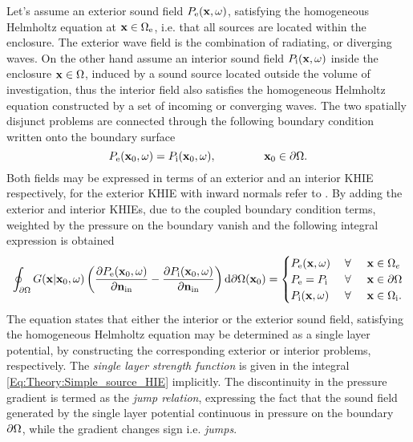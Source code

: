 Let's assume an exterior sound field $P_{\mathrm{e}}(\mathbf{x},\omega)$, satisfying the homogeneous Helmholtz equation at $\mathbf{x} \in \Omega_{\mathrm{e}}$, i.e. that all sources are located within the enclosure. The exterior wave field is the combination of radiating, or diverging waves. On the other hand assume an interior sound field $P_{\mathrm{i}}(\mathbf{x},\omega)$ inside the enclosure $\mathbf{x} \in \Omega$, induced by a sound source located outside the volume of investigation, thus the interior field also satisfies the homogeneous Helmholtz equation constructed by a set of incoming or converging waves.
The two spatially disjunct problems are connected through the following boundary condition written onto the boundary surface
\begin{equation}
P_{\mathrm{e}}(\vxo,\omega) = P_{\mathrm{i}}(\vxo,\omega), \hspace{15mm} \vxo \in \dO.
\end{equation}
Both fields may be expressed in terms of an exterior and an interior KHIE respectively, for the exterior KHIE with inward normals refer to \cite[eq. 8.30]{Williams1999}.
By adding the exterior and interior KHIEs, due to the coupled boundary condition terms, weighted by the pressure on the boundary vanish and the following integral expression is obtained \cite[p.~268.]{Williams1999}
\begin{equation}
\oint_{\partial \Omega} 
G(\mathbf{x}|\mathbf{x}_0,\omega) 
\left(
\frac{\partial P_{\mathrm{e}}(\mathbf{x}_0,\omega)}{\partial \mathbf{n}_{\mathrm{in}}} - \frac{\partial P_{\mathrm{i}}(\mathbf{x}_0,\omega)}{\partial \mathbf{n}_{\mathrm{in}}} 
\right)
\mathrm{d} \partial \Omega ( \mathbf{x}_0)
= 
\begin{cases} 
P_{\mathrm{e}}(\mathbf{x},\omega)           & \hspace{1mm} \forall \hspace{5mm}  \mathbf{x} \in \Omega_e  	   \\
P_{\mathrm{e}}=P_{\mathrm{i}} & \hspace{1mm} \forall \hspace{5mm}         \mathbf{x} \in \partial \Omega  \\
P_{\mathrm{i}}(\mathbf{x},\omega) 			& \hspace{1mm} \forall \hspace{5mm}   \mathbf{x} \in \Omega_{\mathrm{i}}.
\end{cases}
\label{Eq:Theory:Simple_source_HIE}
\end{equation}
The equation states that either the interior or the exterior sound field, satisfying the homogeneous Helmholtz equation may be determined as a single layer potential, by constructing the corresponding exterior or interior problems, respectively.
The \emph{single layer strength function} is given in the integral \eqref{Eq:Theory:Simple_source_HIE} implicitly.
The discontinuity in the pressure gradient is termed as the \emph{jump relation}, expressing the fact that the sound field generated by the single layer potential continuous in pressure on the boundary $\partial \Omega$, while the gradient changes sign i.e. \emph{jumps}.

